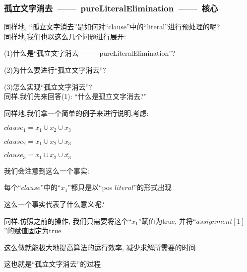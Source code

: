         \subsubsection{孤立文字消去\ ——\ pureLiteralElimination\ ——\ 核心}
        \noindent
        同样地,
        ``孤立文字消去''是如何对``clause''中的``literal''进行预处理的呢?
        \\
        \noindent
        \newline
        \noindent
        同样地,我们也以这么几个问题进行展开:\\
            \par
            (1)什么是``孤立文字消去\ ——\ pureLiteralElimination''?\par
            (2)为什么要进行``孤立文字消去''?\par
            (3)怎么实现``孤立文字消去''?\\
        \noindent
        \newline
        同样,我们先来回答(1):   ``什么是孤立文字消去?''\\
        \par
        同样地,我们拿一个简单的例子来进行说明,考虑:
        \begin{center}
            $clause_{1} = x_{1} \cup \overline{x_{2}} \cup x_{3}$
        \end{center}
        \begin{center}
            $clause_{2} = x_{1} \cup x_{2} \cup x_{3}$
        \end{center}
        \begin{center}
            $clause_{3} = x_{1} \cup x_{2} \cup \overline{x_{3}}$
        \end{center}
        \par
        我们会注意到这么一个事实:
        \begin{center}
            每个``$clause$''中的``$x_{1}$''都只是以``pos $literal$''的形式出现
        \end{center}
        \par
        这么一个事实代表了什么意义呢?
        \par
        同样,仿照之前的操作,
        我们只需要将这个``$x_{1}$''赋值为true,
        并将``$assignment[1]$''的赋值固定为true
        \par
        这么做就能极大地提高算法的运行效率,
        减少求解所需要的时间\par
        这也就是``孤立文字消去''的过程
        \newline
        \par
